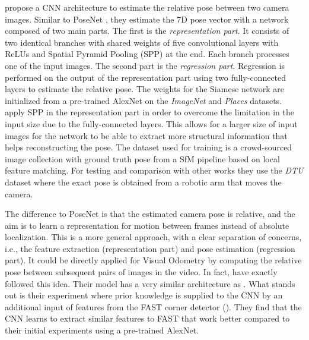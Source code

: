 			\cite{melekhov2017poseCNN} propose a CNN architecture to estimate the relative pose between two camera images.
			Similar to PoseNet \cite{kendall2015posenet}, they estimate the 7D pose vector with a network composed of two main parts.
			The first is the \emph{representation part}.
			It consists of two identical branches with shared weights of five convolutional layers with ReLUs and Spatial Pyramid Pooling (SPP) at the end.
			Each branch processes one of the input images.
			The second part is the \emph{regression part}.
			Regression is performed on the output of the representation part using two fully-connected layers to estimate the relative pose.
			The weights for the Siamese network are initialized from a pre-trained AlexNet on the \emph{ImageNet} and \emph{Places} datasets.
			\citeauthor{melekhov2017poseCNN} apply SPP in the representation part in order to overcome the limitation in the input size due to the fully-connected layers.
			This allows for a larger size of input images for the network to be able to extract more structural information that helps reconstructing the pose.
			The dataset used for training is a crowd-sourced image collection with ground truth pose from a SfM pipeline based on local feature matching.
			For testing and comparison with other works they use the \emph{DTU} dataset where the exact pose is obtained from a robotic arm that moves the camera.
			
			The difference to PoseNet is that the estimated camera pose is relative, and the aim is to learn a representation for motion between frames instead of absolute localization.
			This is a more general approach, with a clear separation of concerns, i.e., the feature extraction (representation part) and pose estimation (regression part).
			It could be directly applied for Visual Odometry by computing the relative pose between subsequent pairs of images in the video. 
			In fact, \cite{mohanty2016deepvo} have exactly followed this idea.
			Their model has a very similar architecture as \citeauthor{melekhov2017poseCNN}.
			What stands out is their experiment where prior knowledge is supplied to the CNN by an additional input of features from the FAST corner detector (\cite{rosten2006machine}).
			They find that the CNN learns to extract similar features to FAST that work better compared to their initial experiments using a pre-trained AlexNet.
			
